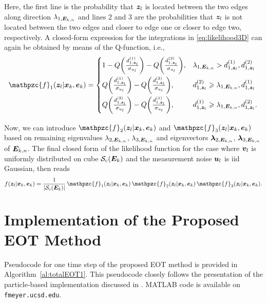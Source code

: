 \documentclass[11pt,a4paper]{article}
\newcommand{\ist}{\hspace*{.3mm}}
\newcommand{\nn}{\nonumber}
\begin{document}
Here, the first line is the probability that $\bm{z}_l$ is located between the two edges along direction $\lambda_{1,\M{E}_{k,n}}$ and lines 2 and 3 are the probabilities that $\bm{z}_l$ is not located between the two edges and closer to edge one or closer to edge two, respectively. A closed-form expression for the integrations in \eqref{eq:likelihood3D} can again be obtained by means of the Q-function\vspace{-4mm}, i.e.,
\begin{align}
 &\mathpzc{f}_1(\V{z}_{l} | \V{x}_{k}, \V{e}_{k}) =  \begin{cases}
   1- Q\bigg(\frac{d^{(1)}_{1,\V{z}_l}}{\sigma_{u_{l}}}\bigg) - Q\bigg(\frac{d^{(2)}_{1,\V{z}_l}}{\sigma_{u_{l}}}\bigg), &  \lambda_{1,\M{E}_{k,n}} > d^{(1)}_{1,\V{z}_l}, d^{(2)}_{1,\V{z}_l} \\[3mm]
   Q\bigg(\frac{d^{(1)}_{1,\V{z}_l}}{\sigma_{u_{l}}}\bigg) - Q\bigg(\frac{d^{(2)}_{1,\V{z}_l}}{\sigma_{u_{l}}}\bigg), & d^{(2)}_{1,\V{z}_l} \geq \lambda_{1,\M{E}_{k,n}}, d^{(1)}_{1,\V{z}_l}\\[3mm]
   Q\bigg(\frac{d^{(2)}_{1,\V{z}_l}}{\sigma_{u_{l}}}\bigg) - Q\bigg(\frac{d^{(1)}_{1,\V{z}_l}}{\sigma_{u_{l}}}\bigg), & d^{(1)}_{1,\V{z}_l} \geq  \lambda_{1,\M{E}_{k,n}}, d^{(2)}_{1,\V{z}_l}. \nn
   \end{cases}\nn \\[-5mm]
   \nn
\end{align}

Now, we can introduce $\mathpzc{f}_2(\V{z}_{l} | \V{x}_{k}, \V{e}_{k})$ and $\mathpzc{f}_3(\V{z}_{l} | \V{x}_{k}, \V{e}_{k})$ based on remaining eigenvalues $\lambda_{2,\M{E}_{k,n}}$, $\lambda_{3,\M{E}_{k,n}}$ and eigenvectors $\V{\lambda}_{2,\M{E}_{k,n}}$, $\V{\lambda}_{3,\M{E}_{k,n}}$ of $\M{E}_{k,n}$. The final closed form of the likelihood function for the case where $\bm{v}_l$ is uniformly distributed on cube $\Set{S}_{\mathrm{c}}(\M{E}_{k})$ and the measurement noise $\bm{u}_l$ is iid Gaussian, then reads
\begin{align}
f(\V{z}_{l} | \V{x}_{k}, \V{e}_{k})  = \frac{1}{| \Set{S}_{\mathrm{c}}(\M{E}_{k}) |} \ist\ist \mathpzc{f}_1(\V{z}_{l} | \V{x}_{k}, \V{e}_{k}) \ist\ist \mathpzc{f}_2(\V{z}_{l} | \V{x}_{k}, \V{e}_{k}) \ist\ist \mathpzc{f}_3(\V{z}_{l} | \V{x}_{k}, \V{e}_{k}). \nn\\[-7mm]
\nn
 \end{align}

\section{Implementation of the Proposed EOT Method}
Pseudocode for one time step of the proposed EOT method is provided in Algorithm~\ref{al:totalEOT1}. This pseudocode closely follows the presentation of the particle-based implementation discussed in \cite[Section~V]{MeyWil:J21}. MATLAB code is available on \texttt{fmeyer.ucsd.edu}.
\end{document}
